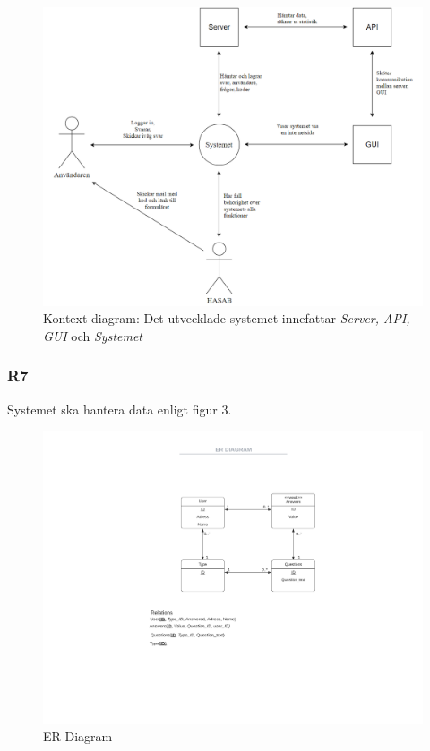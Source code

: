\documentclass{article}
\begin{document}
    \begin{figure}[h!]
    \caption{Kontext-diagram: Det utvecklade systemet innefattar \textit{Server, API, GUI} och \textit{Systemet}}
    \includegraphics[width=150mm]{Kontextdiagram.png}
    
    \end{figure}
    
    \newpage
    \subsubsection*{R7}
    Systemet ska hantera data enligt figur 3.
       \begin{figure}[h!]
    
    \includegraphics[width=150mm]{ERDIAGRAM.png}
    \caption{ER-Diagram}
    \end{figure}
    
\end{document}
